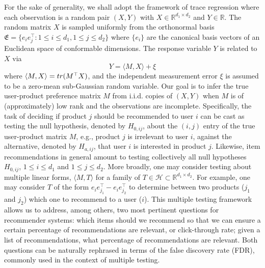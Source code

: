 \documentclass[12pt]{article}
\newcommand{\tr}{{\rm tr}}
\newcommand{\R}{\mathbb{R}}
\newcommand{\cH}{\mathcal{H}}
\theoremstyle{plain}
\begin{document}
\begin{sloppypar}
For the sake of generality, we shall adopt the framework of trace regression where each observation is a random pair $(X,Y)$ with $X\in\R^{d_1\times d_2}$ and $Y\in\R$. The random matrix $X$ is sampled uniformly from the orthonormal basis $\mathfrak{E}=\{e_{i}e_{j}^{\top}: 1\le i\le d_1, 1\le j\le d_2\}$ where $\{e_{i}\}$ are the canonical basis vectors of an Euclidean space of conformable dimensions. The response variable $Y$ is related to $X$ via
\begin{equation}\label{eq:NMC}
	Y=\langle  M, X\rangle +\xi
\end{equation}
where $\langle M, X\rangle=\tr(M^{\top}X)$, and the independent measurement error $\xi$ is assumed to be a zero-mean sub-Gaussian random variable. Our goal is to infer the true user-product preference matrix $M$ from i.i.d. copies of $(X,Y)$ when $M$ is of (approximately) low rank and the observations are incomplete. Specifically, the task of deciding if product $j$ should be recommended to user $i$ can be cast as testing the null hypothesis, denoted by $H_{0,ij}$, about the $(i,j)$ entry of the true user-product matrix $M$, e.g., product $j$ is irrelevant to user $i$, against the alternative, denoted by $H_{a,ij}$, that user $i$ is interested in product $j$. Likewise, item recommendations in general amount to testing collectively all null hypotheses $H_{0,ij}$, $1\le i\le d_1$ and $1\le j\le d_2$. More broadly, one may consider testing about multiple linear forms, $\langle M,T \rangle$ for a family of $T\in \cH\subset \R^{d_1\times d_2}$. For example, one may consider $T$ of the form $e_ie_{j_1}^\top-e_ie_{j_2}^\top$ to determine between two products ($j_1$ and $j_2$) which one to recommend to a user ($i$). This multiple testing framework allows us to address, among others, two most pertinent questions for recommender systems: which items should we recommend so that we can ensure a certain percentage of recommendations are relevant, or click-through rate; given a list of recommendations, what percentage of recommendations are relevant. Both questions can be naturally rephrased in terms of the false discovery rate (FDR), commonly used in the context of multiple testing. 



\end{sloppypar}
\end{document}

